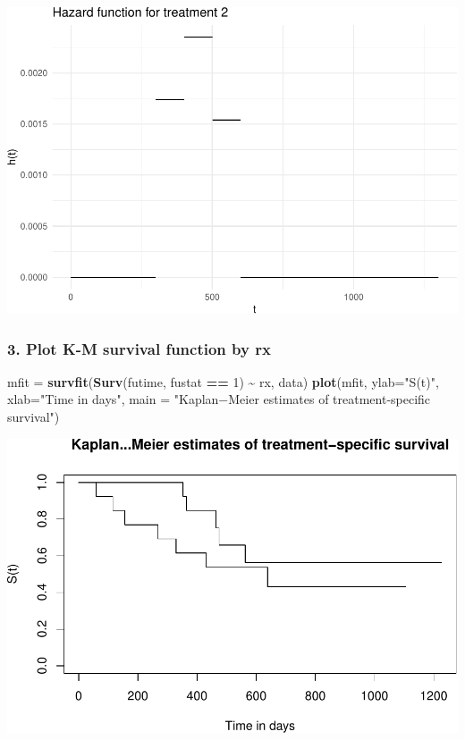\documentclass[
]{article}
\newenvironment{Shaded}{\begin{snugshade}}{\end{snugshade}}
\newcommand{\AttributeTok}[1]{\textcolor[rgb]{0.13,0.29,0.53}{#1}}
\newcommand{\DecValTok}[1]{\textcolor[rgb]{0.00,0.00,0.81}{#1}}
\newcommand{\FunctionTok}[1]{\textcolor[rgb]{0.13,0.29,0.53}{\textbf{#1}}}
\newcommand{\NormalTok}[1]{#1}
\newcommand{\OtherTok}[1]{\textcolor[rgb]{0.56,0.35,0.01}{#1}}
\newcommand{\SpecialCharTok}[1]{\textcolor[rgb]{0.81,0.36,0.00}{\textbf{#1}}}
\newcommand{\StringTok}[1]{\textcolor[rgb]{0.31,0.60,0.02}{#1}}
\begin{document}
\includegraphics{HW3_files/figure-latex/unnamed-chunk-3-2.pdf}

\hypertarget{plot-k-m-survival-function-by-rx}{%
\subsubsection{3. Plot K-M survival function by
rx}\label{plot-k-m-survival-function-by-rx}}

\begin{Shaded}
\begin{Highlighting}[]
\NormalTok{mfit }\OtherTok{=} \FunctionTok{survfit}\NormalTok{(}\FunctionTok{Surv}\NormalTok{(futime, fustat }\SpecialCharTok{==} \DecValTok{1}\NormalTok{) }\SpecialCharTok{\textasciitilde{}}\NormalTok{ rx, data)}
\FunctionTok{plot}\NormalTok{(mfit, }\AttributeTok{ylab=}\StringTok{"S(t)"}\NormalTok{, }\AttributeTok{xlab=}\StringTok{"Time in days"}\NormalTok{,}
     \AttributeTok{main =} \StringTok{"Kaplan−Meier estimates of treatment{-}specific survival"}\NormalTok{)}
\end{Highlighting}
\end{Shaded}

\includegraphics{HW3_files/figure-latex/unnamed-chunk-4-1.pdf}
\end{document}
